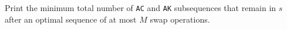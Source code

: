 
Print the minimum total number of \texttt{AC} and \texttt{AK} subsequences that remain in $s$ after an optimal sequence of at most $M$ swap operations.

